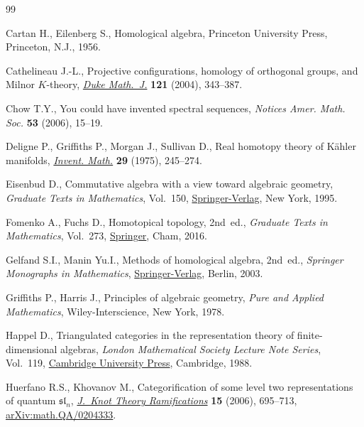 \documentclass[pdftex]{sigma}
\theoremstyle{definition}
\numberwithin{equation}{section}
\begin{document}
\begin{thebibliography}{99}
\footnotesize\itemsep=0pt

Cartan H., Eilenberg S., Homological algebra, Princeton University Press,
 Princeton, N.J., 1956.

Cathelineau J.-L., Projective configurations, homology of orthogonal groups, and
 {M}ilnor {$K$}-theory, \href{https://doi.org/10.1215/S0012-7094-04-12125-6}{\textit{Duke Math.~J.}} \textbf{121} (2004), 343--387.

Chow T.Y., You could have invented spectral sequences, \textit{Notices Amer.
 Math. Soc.} \textbf{53} (2006), 15--19.

Deligne P., Griffiths P., Morgan J., Sullivan D., Real homotopy theory of
 {K}\"{a}hler manifolds, \href{https://doi.org/10.1007/BF01389853}{\textit{Invent. Math.}} \textbf{29} (1975), 245--274.

Eisenbud D., Commutative algebra with a view toward algebraic geometry,
 \textit{Graduate Texts in Mathematics}, Vol.~150, \href{https://doi.org/10.1007/978-1-4612-5350-1}{Springer-Verlag}, New York,
 1995.

Fomenko A., Fuchs D., Homotopical topology, 2nd~ed., \textit{Graduate Texts in
 Mathematics}, Vol.~273, \href{https://doi.org/10.1007/978-3-319-23488-5}{Springer}, Cham, 2016.

Gelfand S.I., Manin Yu.I., Methods of homological algebra, 2nd~ed., \textit{Springer
 Monographs in Mathematics}, \href{https://doi.org/10.1007/978-3-662-12492-5}{Springer-Verlag}, Berlin, 2003.

Griffiths P., Harris J., Principles of algebraic geometry, \textit{Pure and Applied Mathematics}, Wiley-Interscience, New York, 1978.

Happel D., Triangulated categories in the representation theory of
 finite-dimensional algebras, \textit{London Ma\-the\-matical Society Lecture Note
 Series}, Vol.~119, \href{https://doi.org/10.1017/CBO9780511629228}{Cambridge University Press}, Cambridge, 1988.

Huerfano R.S., Khovanov M., Categorification of some level two representations
 of quantum {$\mathfrak{sl}_n$}, \href{https://doi.org/10.1142/S0218216506004713}{\textit{J.~Knot Theory Ramifications}} \textbf{15} (2006), 695--713, \href{https://arxiv.org/abs/math.QA/0204333}{arXiv:math.QA/0204333}.


\end{thebibliography}
\end{document}
